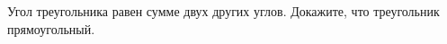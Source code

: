 \begin{ex}
	\begin{condition}
		Угол треугольника равен сумме двух других углов. Докажите, что треугольник прямоугольный.
	\end{condition}
\end{ex}